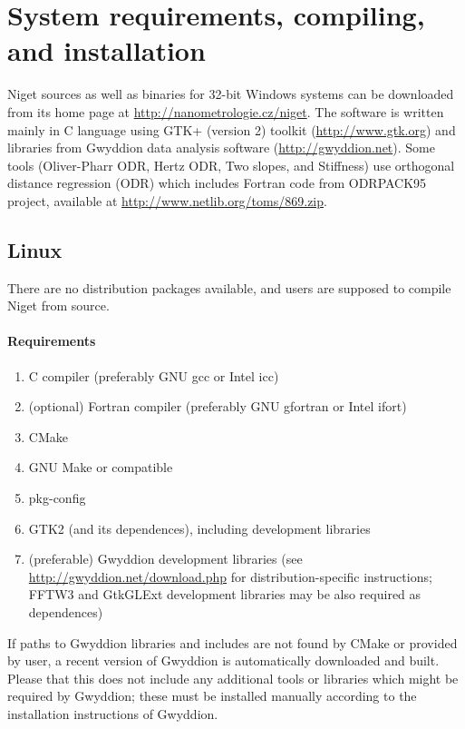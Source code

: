 \section{System requirements, compiling, and installation}

Niget sources as well as binaries for 32-bit Windows systems can be downloaded from its home page at \url{http://nanometrologie.cz/niget}.
The software is written mainly in C language using GTK+ (version 2) toolkit (\url{http://www.gtk.org}) and libraries from Gwyddion data analysis software (\url{http://gwyddion.net}). 
Some tools (Oliver-Pharr ODR, Hertz ODR, Two slopes, and Stiffness) use orthogonal distance regression (ODR) which includes Fortran code from ODRPACK95 project, available at \url{http://www.netlib.org/toms/869.zip}.

\subsection{Linux}

There are no distribution packages available, and users are supposed to compile Niget from source.

\paragraph{Requirements}

\begin{enumerate}
\item C compiler (preferably GNU gcc or Intel icc)
\item (optional) Fortran compiler (preferably GNU gfortran or Intel ifort)
\item CMake
\item GNU Make or compatible
\item pkg-config
\item GTK2 (and its dependences), including development libraries
\item (preferable) Gwyddion development libraries (see \url{http://gwyddion.net/download.php} for distribution-specific instructions; FFTW3 and GtkGLExt development libraries may be also required as dependences)
\end{enumerate}

If paths to Gwyddion libraries and includes are not found by CMake or provided by user, a recent version of Gwyddion is automatically downloaded and built. Please that this does not include any additional tools or libraries which might be required by Gwyddion; these must be installed manually according to the installation instructions of Gwyddion.

